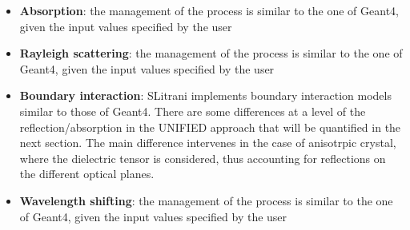 \begin{itemize}
\item \textbf{Absorption}: the management of the process is similar to the one of Geant4, given the input values specified by the user
\item \textbf{Rayleigh scattering}: the management of the process is similar to the one of Geant4, given the input values specified by the user
\item \textbf{Boundary interaction}: SLitrani implements boundary interaction models similar to those of Geant4. There are some differences at a level of the reflection/absorption in the UNIFIED approach that will be quantified in the next section.
The main difference intervenes in the case of anisotrpic crystal, where the dielectric tensor is considered, thus accounting for reflections on the different optical planes.
\item \textbf{Wavelength shifting}: the management of the process is similar to the one of Geant4, given the input values specified by the user
\end{itemize}

